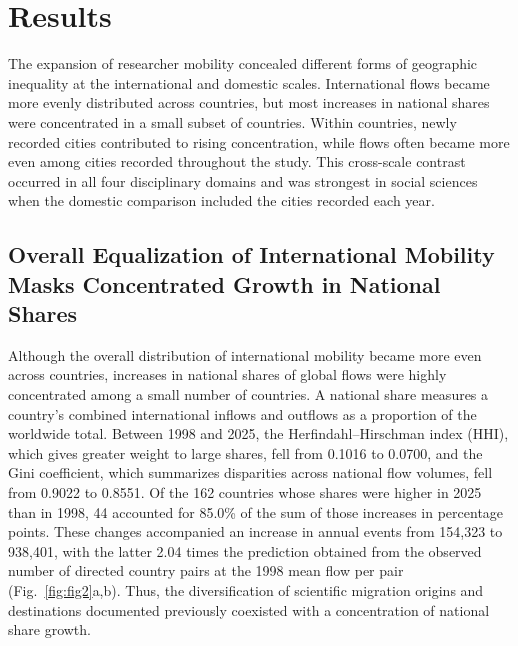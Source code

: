 \section{Results}

The expansion of researcher mobility concealed different forms of geographic inequality at the international and domestic scales. International flows became more evenly distributed across countries, but most increases in national shares were concentrated in a small subset of countries. Within countries, newly recorded cities contributed to rising concentration, while flows often became more even among cities recorded throughout the study. This cross-scale contrast occurred in all four disciplinary domains and was strongest in social sciences when the domestic comparison included the cities recorded each year.

\subsection{Overall Equalization of International Mobility Masks Concentrated Growth in National Shares}

Although the overall distribution of international mobility became more even across countries, increases in national shares of global flows were highly concentrated among a small number of countries. A national share measures a country's combined international inflows and outflows as a proportion of the worldwide total. Between 1998 and 2025, the Herfindahl--Hirschman index (HHI), which gives greater weight to large shares, fell from 0.1016 to 0.0700, and the Gini coefficient, which summarizes disparities across national flow volumes, fell from 0.9022 to 0.8551. Of the 162 countries whose shares were higher in 2025 than in 1998, 44 accounted for 85.0\% of the sum of those increases in percentage points. These changes accompanied an increase in annual events from 154,323 to 938,401, with the latter 2.04 times the prediction obtained from the observed number of directed country pairs at the 1998 mean flow per pair (Fig.~\ref{fig:fig2}a,b). Thus, the diversification of scientific migration origins and destinations documented previously\cite{ref008} coexisted with a concentration of national share growth.

